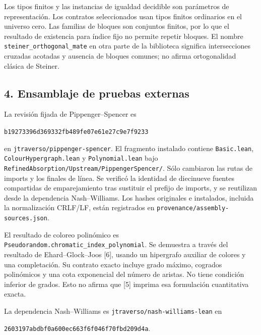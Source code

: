 \documentclass[spanish,11pt,a4paper]{article}
\begin{document}
Los tipos finitos y las instancias de igualdad decidible son parámetros de representación. Los contratos seleccionados usan tipos finitos ordinarios en el universo cero. Las familias de bloques son conjuntos finitos, por lo que el resultado de existencia para índice fijo no permite repetir bloques. El nombre \texttt{steiner\_\allowbreak{}orthogonal\_\allowbreak{}mate} en otra parte de la biblioteca significa intersecciones cruzadas acotadas y ausencia de bloques comunes; no afirma ortogonalidad clásica de Steiner.

\subsection{4. Ensamblaje de pruebas externas}\label{ensamblaje-de-pruebas-externas}

La revisión fijada de Pippenger--Spencer es

\texttt{b1927339\allowbreak{}6d369332\allowbreak{}fb489fe0\allowbreak{}7e61e27c\allowbreak{}9e7f9233}

en \texttt{jtraverso/\allowbreak{}pippenger-spencer}. El fragmento instalado contiene \texttt{Basic.\allowbreak{}lean}, \texttt{Colour\allowbreak{}Hypergraph.\allowbreak{}lean} y \texttt{Polynomial.\allowbreak{}lean} bajo \texttt{Refined\allowbreak{}Absorption/\allowbreak{}Upstream/\allowbreak{}Pippenger\allowbreak{}Spencer/\allowbreak{}}. Sólo cambiaron las rutas de imports y los finales de línea. Se verificó la identidad de diecinueve fuentes compartidas de emparejamiento tras sustituir el prefijo de imports, y se reutilizan desde la dependencia Nash--Williams. Los hashes originales e instalados, incluida la normalización CRLF/LF, están registrados en \texttt{provenance/\allowbreak{}assembly-sources.\allowbreak{}json}.

El resultado de coloreo polinómico es \texttt{Pseudorandom.\allowbreak{}chromatic\_\allowbreak{}index\_\allowbreak{}polynomial}. Se demuestra a través del resultado de Ehard--Glock--Joos {[}6{]}, usando un hipergrafo auxiliar de colores y una completación. Su contrato exacto incluye grado máximo, cogrados polinómicos y una cota exponencial del número de aristas. No tiene condición inferior de grados. Esto no afirma que {[}5{]} imprima esa formulación cuantitativa exacta.

La dependencia Nash--Williams es \texttt{jtraverso/\allowbreak{}nash-williams-lean} en

\texttt{2603197a\allowbreak{}bdbf0a60\allowbreak{}0ec663f6\allowbreak{}f046f70f\allowbreak{}bd209d4a}.
\end{document}
